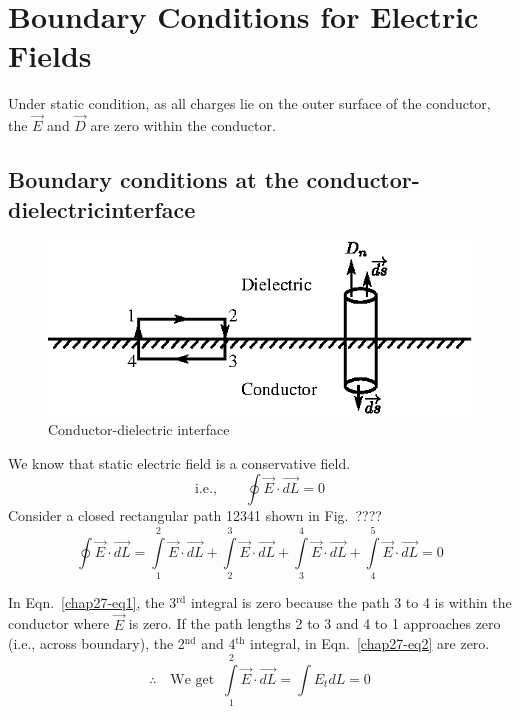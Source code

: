 \setcounter{chapter}{26}
\chapter{Boundary Conditions for Electric Fields}\label{chap27}

Under static condition, as all charges lie on the outer surface of the conductor, the $\vec{E}$ and $\vec{D}$ are zero within the conductor.

\section{Boundary conditions at the conductor-dielectric\break interface}
\begin{figure}[H]
\centering
\includegraphics[scale=1.1]{images/fig1.eps}
\caption{Conductor-dielectric interface}\label{chap27-fig1}
\end{figure}

We know that static electric field is a conservative field. 
$$
\textstyle\text{i.e.,}\qquad \oint \vec{E} \cdot \vec{dL} = 0
$$
Consider a closed rectangular path 12341 shown in Fig.~????
\begin{equation*}
\textstyle\oint \vec{E} \cdot \vec{dL} = \int\limits_{1}^{2} \vec{E} \cdot \vec{dL} + \int\limits_{2}^{3} \vec{E} \cdot \vec{dL} + \int\limits_{3}^{4} \vec{E} \cdot \vec{dL} + \int\limits_{4}^{5} \vec{E} \cdot \vec{dL} = 0\label{chap27-eq1}
\end{equation*}

In Eqn.~\eqref{chap27-eq1}, the 3$^{\text{rd}}$ integral is zero because the path 3 to 4 is within the conductor where $\vec{E}$ is zero. If the path lengths 2 to 3 and 4 to 1 approaches zero (i.e., across boundary), the 2$^{\text{nd}}$ and 4$^{\text{th}}$ integral, in Eqn.~\eqref{chap27-eq2} are zero.
\begin{equation*}
\textstyle\therefore\quad \text{We get } \ \int\limits_{1}^{2} \vec{E} \cdot \vec{dL} = \int E_{t}dL = 0\label{chap27-eq2}
\end{equation*}

